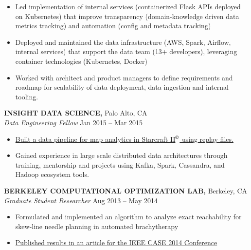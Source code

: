 \documentclass[geomargin]{res}
\begin{document}
\begin{resume}
\begin{itemize}
  \item Led implementation of internal services (containerized Flask APIs deployed on Kubernetes) that improve transparency (domain-knowledge driven data metrics tracking) and automation (config and metadata tracking)

  \item Deployed and maintained the data infrastructure (AWS, Spark, Airflow, internal services) that support the data team (13+ developers), leveraging container technologies (Kubernetes, Docker)

  \item Worked with architect and product managers to define requirements and roadmap for scalability of data deployment, data ingestion and internal tooling.

\end{itemize}
\vspace{-1mm}

{\bf INSIGHT DATA SCIENCE,} Palo Alto, CA \\
{\em Data Engineering Fellow} \hfill
Jan 2015 -- Mar 2015 \\                                          \vspace{-4mm}
\begin{itemize}                                         \itemsep1pt %
  \item \href{https://github.com/guang/stargazer}
    {Built a data pipeline for map analytics in Starcraft II\(^\copyright\)
     using replay files.}

  \item Gained experience in large scale distributed data architectures through training,
    mentorship and projects using Kafka, Spark, Cassandra, and Hadoop ecosystem tools.
\end{itemize}
\vspace{-1mm}

{\bf BERKELEY COMPUTATIONAL OPTIMIZATION LAB,} Berkeley, CA \\
{\em Graduate Student Researcher} \hfill
Aug 2013 -- May 2014 \\                                          \vspace{-4mm}
\begin{itemize}                                         \itemsep1pt %
        \item    Formulated and implemented an algorithm to analyze exact reachability for skew-line needle planning in automated brachytherapy
        \item    \href{http://ieeexplore.ieee.org/abstract/document/6899376/}{Published results in an article for the IEEE CASE 2014 Conference}
\end{itemize}
\vspace{-1mm}



\end{resume}
\end{document}
